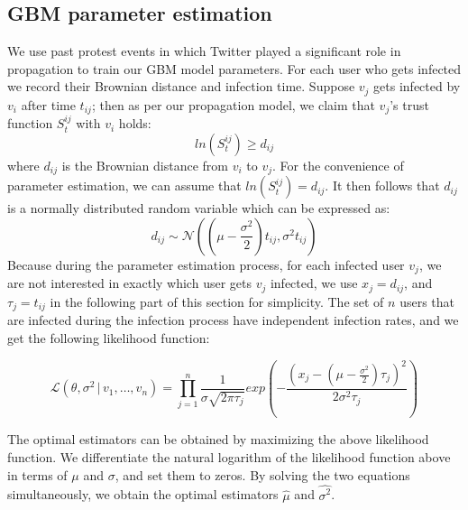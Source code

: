 \subsection{GBM parameter estimation}
We use past protest events in
which Twitter played a significant role in propagation to train
our GBM model parameters. For each user who gets
infected we record their Brownian distance and infection time. Suppose $v_j$ gets infected by $v_i$ after time $t_{ij}$; then as per our propagation model, we claim that $v_j$'s trust function $S_t^{ij}$ with $v_i$ holds:
\begin{equation}
ln(S_t^{ij}) \geq d_{ij}
\end{equation}
where $d_{ij}$ is the Brownian distance from $v_i$ to $v_j$. For the convenience of parameter estimation, we can assume that $ln(S_t^{ij}) = d_{ij}$. It
then follows that $d_{ij}$ is a normally distributed random variable which can be expressed as:
\begin{equation}
d_{ij}\sim \mathcal{N}((\mu - \frac{\sigma^2}{2})t_{ij}, \sigma ^{2}t_{ij})
\end{equation}
Because during the parameter estimation process, for each infected user $v_j$, we are not interested in exactly which
user gets $v_j$ infected, we use $x_j = d_{ij}$, and $\tau_j = t_{ij}$ in the following part of this section for simplicity. The set of $n$ users that are infected during the infection process have independent infection rates, and we get the following likelihood function:

\begin{equation*}
{\mathcal  {L}}(\theta, \sigma^2 \,|\,v_{1},\ldots ,v_{n})=\prod _{{j=1}}^{n}\frac{1}{\sigma\sqrt{2\pi \tau_j}}exp(-\frac{(x_j-(\mu-\frac{\sigma^2}{2})\tau_j)^2}{2\sigma^2\tau_j})
\end{equation*}

The optimal estimators can be obtained by maximizing the above likelihood function.
We differentiate the natural logarithm of the likelihood function above in terms of $\mu$ and $\sigma$, and set them to zeros. By solving the
two equations simultaneously, we obtain the optimal estimators $\hat{\mu}$ and $\hat{\sigma^2}$.

%
%

